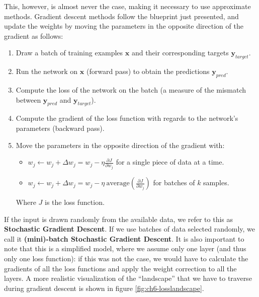 This, however, is almost never the case, making it necessary to use approximate methods. Gradient descent methods follow the blueprint just presented, and update the weights by moving the parameters in the opposite direction of the gradient as follows:

\begin{enumerate}
    \item Draw a batch of training examples $\boldsymbol{x}$ and their corresponding targets $\boldsymbol{y}_{target}$.
    \item Run the network on $\boldsymbol{x}$ (forward pass) to obtain the predictions $\boldsymbol{y}_{pred}$.
    \item Compute the loss of the network on the batch (a measure of the mismatch between $\boldsymbol{y}_{pred}$ and $\boldsymbol{y}_{target}$).
    \item Compute the gradient of the loss function with regards to the network’s parameters (backward pass). \item Move the parameters in the opposite direction of the gradient with:
    
        \begin{itemize}
            \item $w_j \leftarrow w_j + \Delta w_j = w_j - \eta \frac{\partial J}{\partial w_j}$ for a single piece of data at a time.
            \item $w_j \leftarrow w_j + \Delta w_j = w_j - \eta\ \text{average} \left( \frac{\partial J}{\partial w_j} \right)$ for batches of $k$ samples.
        \end{itemize}
        
        Where $J$ is the loss function.
\end{enumerate}

If the input is drawn randomly from the available data, we refer to this as \textbf{Stochastic Gradient Descent}. If we use batches of data selected randomly, we call it \textbf{(mini)-batch Stochastic Gradient Descent}. It is also important to note that this is a simplified model, where we assume only one layer (and thus only one loss function): if this was not the case, we would have to calculate the gradients of all the loss functions and apply the weight correction to all the layers. A more realistic visualization of the ``landscape'' that we have to traverse during gradient descent is shown in figure \ref{fig:ch6-losslandscape}.

